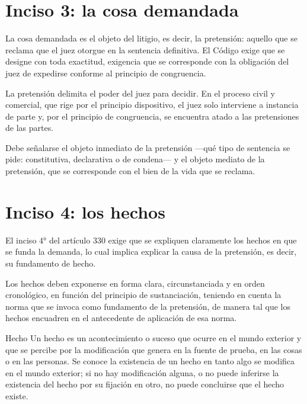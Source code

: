 \documentclass[12pt,oneside]{book}
\begin{document}
\section{Inciso 3: la cosa demandada}

La cosa demandada es el objeto del litigio, es decir, la pretensión: aquello que se reclama que el juez otorgue en la sentencia definitiva. El Código exige que se designe con toda exactitud, exigencia que se corresponde con la obligación del juez de expedirse conforme al principio de congruencia.

\begin{important}
La pretensión delimita el poder del juez para decidir. En el proceso civil y comercial, que rige por el principio dispositivo, el juez solo interviene a instancia de parte y, por el principio de congruencia, se encuentra atado a las pretensiones de las partes.
\end{important}

Debe señalarse el objeto inmediato de la pretensión —qué tipo de sentencia se pide: constitutiva, declarativa o de condena— y el objeto mediato de la pretensión, que se corresponde con el bien de la vida que se reclama.

\section{Inciso 4: los hechos}

El inciso 4° del artículo 330 exige que se expliquen claramente los hechos en que se funda la demanda, lo cual implica explicar la causa de la pretensión, es decir, su fundamento de hecho.

Los hechos deben exponerse en forma clara, circunstanciada y en orden cronológico, en función del principio de sustanciación, teniendo en cuenta la norma que se invoca como fundamento de la pretensión, de manera tal que los hechos encuadren en el antecedente de aplicación de esa norma.

\begin{definition}{Hecho}
Un hecho es un acontecimiento o suceso que ocurre en el mundo exterior y que se percibe por la modificación que genera en la fuente de prueba, en las cosas o en las personas. Se conoce la existencia de un hecho en tanto algo se modifica en el mundo exterior; si no hay modificación alguna, o no puede inferirse la existencia del hecho por su fijación en otro, no puede concluirse que el hecho existe.
\end{definition}
\end{document}
